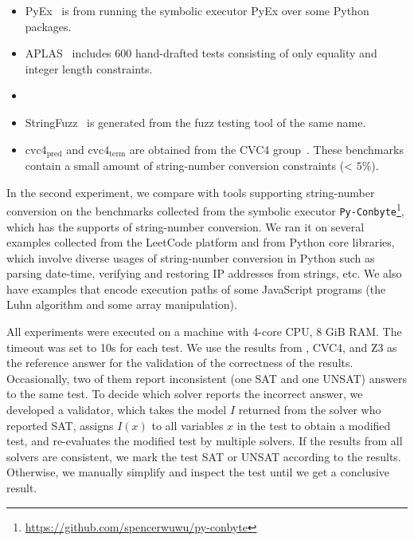 \begin{itemize}
	\item PyEx~\cite{pyex} is from running the symbolic executor PyEx over some Python packages.
	
	\smallskip
	
	
	\item APLAS~\cite{aplas} includes 600 hand-drafted tests consisting of only equality and integer length constraints.
	
	
		\smallskip


	\item {}
	
		\smallskip

	\item StringFuzz~\cite{blotsky2018stringfuzz}  is generated from the fuzz testing tool of the same name.
	
		\smallskip

	\item $\text{cvc4}_{\text{pred}}$ and $\text{cvc4}_{\text{term}}$ are obtained from the CVC4 group~\cite{termEQ}. These benchmarks contain a small amount of string-number conversion constraints (< $5\%$).
\end{itemize}

In the second experiment, we compare with tools supporting string-number conversion on the benchmarks collected from the symbolic executor \texttt{Py-Conbyte}\footnote{\url{https://github.com/spencerwuwu/py-conbyte}}, which has the supports of string-number conversion. We ran it on several examples collected from the LeetCode platform and from Python core libraries, which involve diverse usages of string-number conversion in Python such as parsing date-time, verifying and restoring IP addresses from strings, etc. We also have examples that encode execution paths of some JavaScript programs (the Luhn algorithm and some array manipulation).

All experiments were executed on a machine with 4-core CPU, 8 GiB RAM. The timeout was set to 10s for each test.
We use the results from {\tool}, CVC4, and Z3 as the reference answer for the validation of the correctness of the results. Occasionally, two of them report inconsistent (one SAT and one UNSAT) answers to the same test. To decide which solver reports the incorrect answer, we developed a validator, which takes the model $I$ returned from the solver who reported SAT, assigns $I(x)$ to all variables $x$ in the test to obtain a modified test, and re-evaluates the modified test by multiple solvers. If the results from all solvers are consistent, we mark the test SAT or UNSAT according to the results. Otherwise, we manually simplify and inspect the test until we get a conclusive result. 

